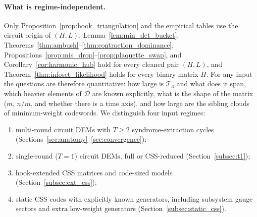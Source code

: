 \documentclass[12pt]{article}
\theoremstyle{definition}
\newcommand{\Dc}{\mathcal{D}}
\newcommand{\Tc}{\mathcal{T}_3}
\begin{document}
\paragraph{What is regime-independent.}
Only Proposition~\ref{prop:hook_triangulation} and the empirical tables use the circuit origin of $(H, L)$.
Lemma~\ref{lem:min_det_bucket}, Theorems~\ref{thm:ambush}--\ref{thm:contraction_dominance},
Propositions~\ref{prop:mis_drop}--\ref{prop:plaquette_swap}, and Corollary~\ref{cor:harmonic_hub} hold for every
cleaned pair $(H, L)$, and Theorem~\ref{thm:infoset_likelihood} holds for every binary matrix $H$. For any input the
questions are therefore quantitative: how large is $\Tc$ and what does it span, which heavier elements of $\Dc$ are
known explicitly, what is the shape of the matrix ($m$, $n/m$, and whether there is a time axis), and how large are
the sibling clouds of minimum-weight codewords. We distinguish four input regimes:
\begin{enumerate}[label=(R\arabic*)]
  \item multi-round circuit DEMs with $T \ge 2$ syndrome-extraction cycles
    (Sections~\ref{sec:anatomy}--\ref{sec:convergence});
  \item single-round ($T = 1$) circuit DEMs, full or CSS-reduced (Section~\ref{subsec:t1});
  \item hook-extended CSS matrices and code-sized models (Section~\ref{subsec:ext_css});
  \item static CSS codes with explicitly known generators, including subsystem gauge sectors and extra low-weight
    generators (Section~\ref{subsec:static_css}).
\end{enumerate}
\end{document}
